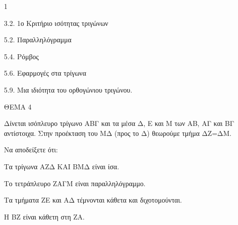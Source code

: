 \begin{ylh}{1}
    \item 3.2. 1ο Κριτήριο ισότητας τριγώνων
    \item 5.2. Παραλληλόγραμμα
    \item 5.4. Ρόμβος
    \item 5.6. Εφαρμογές στα τρίγωνα
    \item 5.9. Μια ιδιότητα του ορθογώνιου τριγώνου.
\end{ylh}

ΘΕΜΑ 4

Δίνεται ισόπλευρο τρίγωνο ΑΒΓ και τα μέσα Δ, Ε και Μ των ΑΒ, ΑΓ και ΒΓ αντίστοιχα. Στην προέκταση του ΜΔ (προς το Δ) θεωρούμε τμήμα ΔΖ=ΔΜ.

Να αποδείξετε ότι:

\begin{alist}
\item Τα τρίγωνα ΑΖΔ ΚΑΙ ΒΜΔ είναι ίσα. 

\item Το τετράπλευρο ΖΑΓΜ είναι παραλληλόγραμμο. 

\item Τα τμήματα ΖΕ και ΑΔ τέμνονται κάθετα και διχοτομούνται. 

\item Η ΒΖ είναι κάθετη στη ΖΑ. 


\end{alist}
